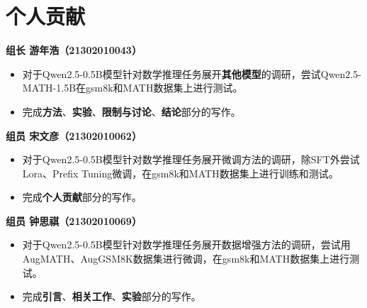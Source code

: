 \section{个人贡献}
\label{sec:personalcontribution}

\textbf{组长 游年浩（21302010043）} 
\begin{itemize}  
    \item 对于Qwen2.5-0.5B模型针对数学推理任务展开\textbf{其他模型}的调研，尝试Qwen2.5-MATH-1.5B在gsm8k和MATH数据集上进行测试。
    \item 完成\textbf{方法}、\textbf{实验}、\textbf{限制与讨论}、\textbf{结论}部分的写作。
\end{itemize}

\textbf{组员 宋文彦（21302010062）} 
\begin{itemize}  
    \item 对于Qwen2.5-0.5B模型针对数学推理任务展开微调方法的调研，除SFT外尝试Lora、Prefix Tuning微调，在gsm8k和MATH数据集上进行训练和测试。
    \item 完成\textbf{个人贡献}部分的写作。
\end{itemize}

\textbf{组员 钟思祺（21302010069）} 
\begin{itemize} 
    \item 对于Qwen2.5-0.5B模型针对数学推理任务展开数据增强方法的调研，尝试用AugMATH、AugGSM8K数据集进行微调，在gsm8k和MATH数据集上进行测试。
    \item 完成\textbf{引言}、\textbf{相关工作}、\textbf{实验}部分的写作。
\end{itemize}